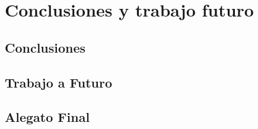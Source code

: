 \chapter{Conclusiones y trabajo futuro}

\section{Conclusiones}
\section{Trabajo a Futuro}
\section{Alegato Final}
